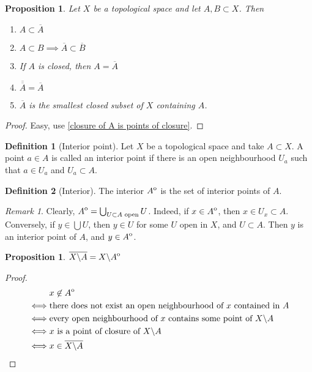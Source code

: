 \documentclass{article}
\theoremstyle{definition}
\newtheorem{defn}{Definition}[section]
\theoremstyle{plain}%
\newtheorem{prop}[thm]{Proposition}
\theoremstyle{remark}
\newtheorem*{rem}{Remark}
\newcommand{\Union}{\bigcup}
\newcommand{\interior}[1]{%
  {\kern0pt#1}^{\mathrm{o}}%
}
\begin{document}
\begin{prop}
    Let $X$ be a topological space and let $A, B \subset X$. Then
    \begin{enumerate}
        \item $A \subset \overline{A}$
        \item $A \subset B \implies \overline{A} \subset \overline{B}$
        \item If $A$ is closed, then $A = \overline{A}$
        \item $\overline{\overline{A}} = \overline{A}$
        \item $\overline{A}$ is the smallest closed subset of $X$ containing $A$.
    \end{enumerate}
\end{prop}

\begin{proof}
    Easy, use \ref{closure of A is points of closure}.
\end{proof}

\begin{defn}[Interior point]
    Let $X$ be a topological space and take $A \subset X$. A point $a \in A$ is called an interior point if there is an open neighbourhood $U_a$ such that $a \in U_a$ and $U_a \subset A$.
\end{defn}

\begin{defn}[Interior]
    The interior $\interior{A}$ is the set of interior points of $A$.
\end{defn}

\begin{rem}
    Clearly, $\interior{A} = \Union_{U \subset A \text{ open}} U$. Indeed, if $x \in \interior{A}$, then $x \in U_x \subset A$. Conversely, if $y \in \Union U$, then $y \in U$ for some $U$ open in $X$, and $U \subset A$. Then $y$ is an interior point of $A$, and $y \in \interior{A}$.
\end{rem}

\begin{prop}
    $\overline{X \backslash A} = X \backslash \interior{A}$    
\end{prop}

\begin{proof}
    \begin{align*}
         & x \not \in \interior{A} \\
        \iff & \text{there does not exist an open neighbourhood of $x$ contained in $A$} \\
        \iff & \text{every open neighbourhood of $x$ contains some point of $X \backslash A$} \\
        \iff & \text{$x$ is a point of closure of $X \backslash A$} \\
        \iff & x \in \overline{X \backslash A}
    \end{align*}
\end{proof}
\end{document}
